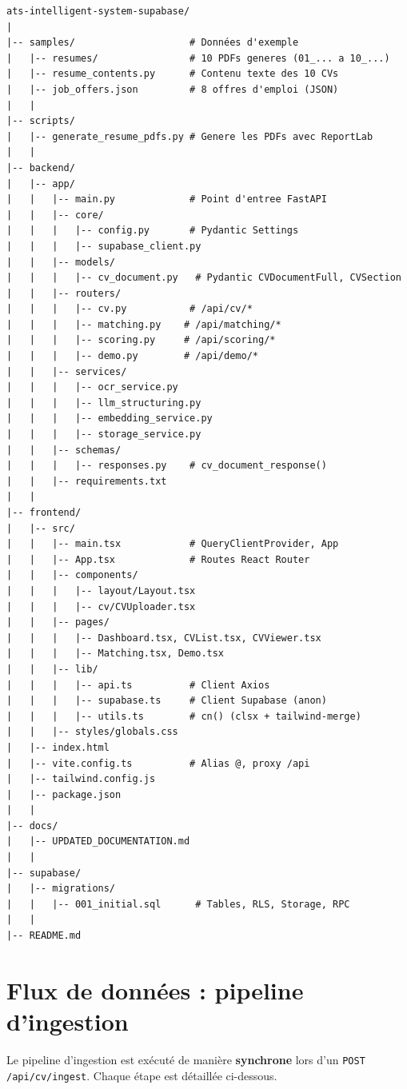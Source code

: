 \documentclass[11pt,a4paper]{report}
\begin{document}
\begin{lstlisting}[caption={Arborescence complète du projet}]
ats-intelligent-system-supabase/
|
|-- samples/                    # Données d'exemple
|   |-- resumes/                # 10 PDFs generes (01_... a 10_...)
|   |-- resume_contents.py      # Contenu texte des 10 CVs
|   |-- job_offers.json         # 8 offres d'emploi (JSON)
|   |
|-- scripts/
|   |-- generate_resume_pdfs.py # Genere les PDFs avec ReportLab
|   |
|-- backend/
|   |-- app/
|   |   |-- main.py             # Point d'entree FastAPI
|   |   |-- core/
|   |   |   |-- config.py       # Pydantic Settings
|   |   |   |-- supabase_client.py
|   |   |-- models/
|   |   |   |-- cv_document.py   # Pydantic CVDocumentFull, CVSection
|   |   |-- routers/
|   |   |   |-- cv.py           # /api/cv/*
|   |   |   |-- matching.py    # /api/matching/*
|   |   |   |-- scoring.py     # /api/scoring/*
|   |   |   |-- demo.py        # /api/demo/*
|   |   |-- services/
|   |   |   |-- ocr_service.py
|   |   |   |-- llm_structuring.py
|   |   |   |-- embedding_service.py
|   |   |   |-- storage_service.py
|   |   |-- schemas/
|   |   |   |-- responses.py    # cv_document_response()
|   |   |-- requirements.txt
|   |
|-- frontend/
|   |-- src/
|   |   |-- main.tsx            # QueryClientProvider, App
|   |   |-- App.tsx             # Routes React Router
|   |   |-- components/
|   |   |   |-- layout/Layout.tsx
|   |   |   |-- cv/CVUploader.tsx
|   |   |-- pages/
|   |   |   |-- Dashboard.tsx, CVList.tsx, CVViewer.tsx
|   |   |   |-- Matching.tsx, Demo.tsx
|   |   |-- lib/
|   |   |   |-- api.ts          # Client Axios
|   |   |   |-- supabase.ts     # Client Supabase (anon)
|   |   |   |-- utils.ts        # cn() (clsx + tailwind-merge)
|   |   |-- styles/globals.css
|   |-- index.html
|   |-- vite.config.ts          # Alias @, proxy /api
|   |-- tailwind.config.js
|   |-- package.json
|   |
|-- docs/
|   |-- UPDATED_DOCUMENTATION.md
|   |
|-- supabase/
|   |-- migrations/
|   |   |-- 001_initial.sql      # Tables, RLS, Storage, RPC
|   |
|-- README.md
\end{lstlisting}

\section{Flux de données : pipeline d'ingestion}

Le pipeline d'ingestion est exécuté de manière \textbf{synchrone} lors d'un \texttt{POST /api/cv/ingest}. Chaque étape est détaillée ci-dessous.
\end{document}
